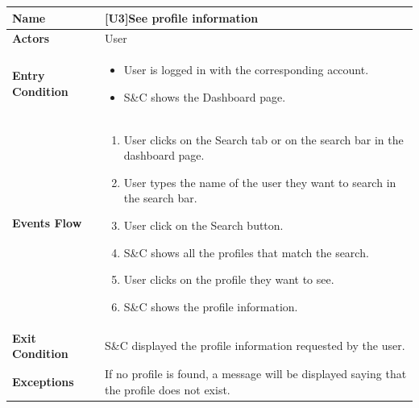 \begin{center}
    \begin{tabular}{|p{9em}|p{27em}|}
        \hline
        \rowcolor{bluepoli!40} %
        \textbf{Name} & \textbf{[U3]See profile information} \\
        \hline
        \textbf{Actors} & User \\
        \hline
        \textbf{Entry Condition} & 
        \begin{itemize}
            \item User is logged in with the corresponding account.
            \item S\&C shows the Dashboard page.
        \end{itemize} \\
        \hline
        \textbf{Events Flow} & 
        \begin{enumerate}
            \item User clicks on the Search tab or on the search bar in the dashboard page. 
            \item User types the name of the user they want to search in the search bar.
            \item User click on the Search button.
            \item S\&C shows all the profiles that match the search.
            \item User clicks on the profile they want to see.
            \item S\&C shows the profile information.
        \end{enumerate} \\
        \hline
        \textbf{Exit Condition} & 
            S\&C displayed the profile information requested by the user.\\
        \hline
        \textbf{Exceptions} &
            If no profile is found, a message will be displayed saying that the profile does not exist.\\
        \hline
    \end{tabular}
\end{center}

